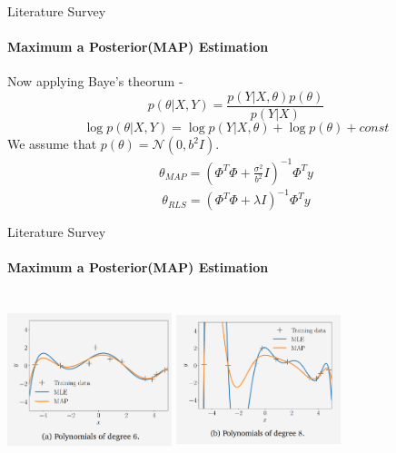 \documentclass[handout,9pt]{beamer}
\numberwithin{theorem}{section}
\begin{document}
\begin{frame}{Literature Survey}
	\begin{spacing}{1}
		\framesubtitle{Maximum a Posterior(MAP) Estimation}
		Now applying Baye's theorum -
		\begin{equation*}
			p(\theta|X, Y) = \frac{p(Y|X, \theta)p(\theta)}{p(Y|X)}
		\end{equation*}\pause
		\begin{equation*}
			\log p(\theta|X, Y) =  \log p(Y|X, \theta) + \log p(\theta) + const 
		\end{equation*}\pause
		We assume that $p(\theta) = \mathcal{N}(0, b^2I)$.\\ \pause
		\begin{align*}
			\boxed{\theta_{MAP} = (\Phi^T\Phi + \frac{\sigma^2}{b^2}I)^{-1}\Phi^Ty}
		\end{align*}\pause
		\begin{equation*}
			\theta_{RLS} = (\Phi^T\Phi + \lambda I)^{-1}\Phi^Ty
		\end{equation*} 
		
	\end{spacing}
\end{frame}

\begin{frame}{Literature Survey}
	\begin{spacing}{1}
		\framesubtitle{Maximum a Posterior(MAP) Estimation}
		
		\begin{center}
			\includegraphics[height=5cm,width=4.8cm]{garph13} \includegraphics[height=5cm,width=4.8cm]{graph14} \\
		\end{center}
				
	\end{spacing}
\end{frame}
		
\end{document}
